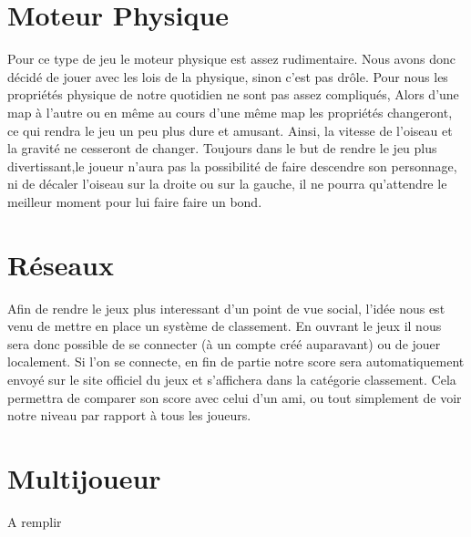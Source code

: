 \documentclass [11pt]{report}
\begin{document}
	\section {Moteur Physique}
			Pour ce type de jeu le moteur physique est assez rudimentaire. Nous avons donc décidé de jouer avec les lois de la physique, sinon c'est pas drôle. Pour nous les propriétés physique de notre quotidien ne sont pas assez compliqués, Alors d'une map à l'autre ou en même au cours d'une même map les propriétés 				changeront, ce qui rendra le jeu un peu plus dure et amusant. Ainsi, la vitesse de l'oiseau et la gravité ne cesseront de changer. Toujours dans le but de rendre le jeu plus divertissant,le joueur n'aura pas la possibilité de faire descendre son personnage, ni de décaler l'oiseau sur la droite ou sur la gauche, il ne pourra qu'attendre le meilleur 	moment pour lui faire faire un bond.\\\vspace{2mm}



	\section {Réseaux}
		Afin de rendre le jeux plus interessant d'un point de vue social, l'idée nous est venu de mettre en place un système de classement. En ouvrant le jeux il nous sera donc possible de se connecter (à un compte créé auparavant) ou de jouer localement. Si l'on se connecte, en fin de partie notre score sera automatiquement envoyé sur 		le site officiel du jeux et s'affichera dans la catégorie classement. Cela permettra de comparer son score avec celui d'un ami, ou tout simplement de voir notre niveau par rapport à tous les joueurs.\\\vspace{3mm}


	\section {Multijoueur}
		A remplir\\\vspace{5mm}
\end{document}
